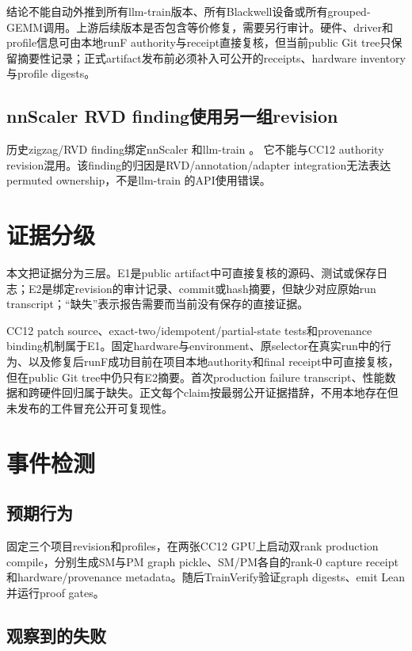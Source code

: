 \documentclass[10.5pt,a4paper]{ctexart}
\begin{document}
结论不能自动外推到所有llm-train版本、所有Blackwell设备或所有grouped-GEMM调用。上游后续版本是否包含等价修复，需要另行审计。硬件、driver和profile信息可由本地runF authority与receipt直接复核，但当前public Git tree只保留摘要性记录；正式artifact发布前必须补入可公开的receipts、hardware inventory与profile digests。

\subsection{nnScaler RVD finding使用另一组revision}

历史zigzag/RVD finding绑定nnScaler
和llm-train
。
它不能与CC12 authority revision混用。该finding的归因是RVD/annotation/adapter integration无法表达permuted ownership，不是llm-train 的API使用错误。

\section{证据分级}

本文把证据分为三层。E1是public artifact中可直接复核的源码、测试或保存日志；E2是绑定revision的审计记录、commit或hash摘要，但缺少对应原始run transcript；“缺失”表示报告需要而当前没有保存的直接证据。

CC12 patch source、exact-two/idempotent/partial-state tests和provenance binding机制属于E1。固定hardware与environment、原selector在真实run中的行为、以及修复后runF成功目前在项目本地authority和final receipt中可直接复核，但在public Git tree中仍只有E2摘要。首次production failure transcript、性能数据和跨硬件回归属于缺失。正文每个claim按最弱公开证据措辞，不用本地存在但未发布的工件冒充公开可复现性。

\section{事件检测}

\subsection{预期行为}

固定三个项目revision和profiles，在两张CC12 GPU上启动双rank production compile，分别生成SM与PM graph pickle、SM/PM各自的rank-0 capture receipt和hardware/provenance metadata。随后TrainVerify验证graph digests、emit Lean并运行proof gates。

\subsection{观察到的失败}
\end{document}
